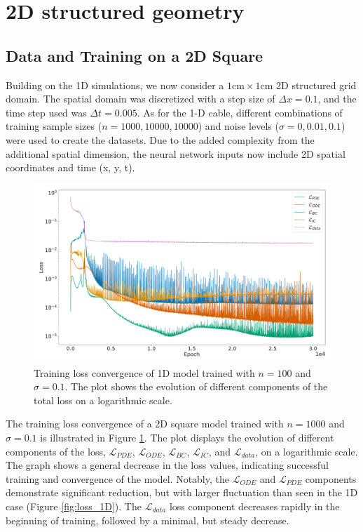 \section{2D structured geometry}
\subsection{Data and Training on a 2D Square}
Building on the 1D simulations, we now consider a $1\mathrm{cm}\times1\mathrm{cm}$ 2D structured grid domain. The spatial domain was discretized with a step size of $\Delta x = 0.1$, and the time step used was $\Delta t = 0.005$. As for the 1-D cable, different combinations of training sample sizes ($n=1000,10000,10000$) and noise levels ($\sigma=0,0.01,0.1$) were used to create the datasets. Due to the added complexity from the additional spatial dimension, the neural network inputs now include 2D spatial coordinates and time (x, y, t).

\begin{figure}[H]
  \centering
  \includegraphics[width=\linewidth]{Figs/1D/loss_history_2D_1000_01.pdf}
  \caption{Training loss convergence of 1D model trained with $n=100$ and $\sigma=0.1$. The plot shows the evolution of different components of the total loss on a logarithmic scale.}
  \label{fig:loss_2D}
\end{figure}
The training loss convergence of a 2D square model trained with \( n = 1000 \) and \( \sigma = 0.1 \) is illustrated in Figure \ref{fig:loss_2D}. The plot displays the evolution of different components of the loss, \( \mathcal{L}_{PDE} \), \( \mathcal{L}_{ODE} \), \( \mathcal{L}_{BC} \), \( \mathcal{L}_{IC} \), and \( \mathcal{L}_{data} \), on a logarithmic scale. The graph shows a general decrease in the loss values, indicating successful training and convergence of the model. Notably, the \( \mathcal{L}_{ODE} \) and \( \mathcal{L}_{PDE} \) components demonstrate significant reduction, but with larger fluctuation than seen in the 1D case (Figure \ref{fig:loss_1D}). The \( \mathcal{L}_{data} \) loss component decreases rapidly in the beginning of training, followed by a minimal, but steady decrease. 



